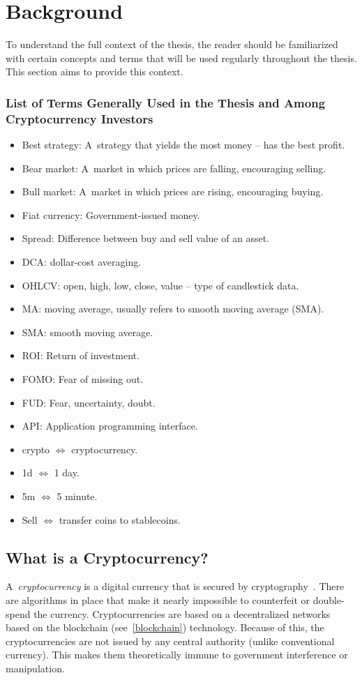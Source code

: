 \chapter{Background}
\label{chapter-background}

To understand the full context of the thesis, the reader should be familiarized with certain concepts and terms that will be used regularly throughout the thesis. This section aims to provide this context.

\subsection*{List of Terms Generally Used in the Thesis and Among Cryptocurrency Investors}
\begin{itemize}
    \item Best strategy: A~strategy that yields the most money -- has the best profit.
    \item Bear market: A~market in which prices are falling, encouraging selling.
    \item Bull market: A~market in which prices are rising, encouraging buying.
    \item Fiat currency: Government-issued money.
    \item Spread: Difference between buy and sell value of an asset.
    \item DCA: dollar-cost averaging.
    \item OHLCV: open, high, low, close, value -- type of candlestick data.
    \item MA: moving average, usually refers to smooth moving average (SMA).
    \item SMA: smooth moving average.
    \item ROI: Return of investment.
    \item FOMO: Fear of missing out.
    \item FUD: Fear, uncertainty, doubt.
    \item API: Application programming interface.
    \item crypto $\Leftrightarrow$ cryptocurrency.
    \item 1d $\Leftrightarrow$ 1 day.
    \item 5m $\Leftrightarrow$ 5 minute.
    \item Sell $\Leftrightarrow$ transfer coins to stablecoins.
\end{itemize}

\section{What is a Cryptocurrency?}
A~\emph{cryptocurrency} is a digital currency that is secured by cryptography~\cite{investopedia-cryptocurrency}. There are algorithms in place that make it nearly impossible to counterfeit or double-spend the currency. Cryptocurrencies are based on a decentralized networks based on the blockchain (see~\ref{blockchain}) technology. Because of this, the cryptocurrencies are not issued by any central authority (unlike conventional currency). This makes them theoretically immune to government interference or manipulation.

